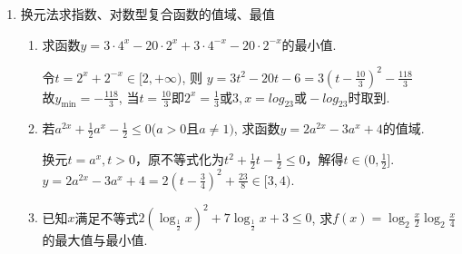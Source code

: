 \begin{enumerate}
\begin{enumerate}
\begin{jieda}
        \end{jieda}
        \item 关于$x$的方程$|3^x-1| = 2a$只有一个解，则$a$的取值范围是\blkda[3]{$[\frac{1}{2}, +\infty) \cup \{0\}$}.
        \begin{jieda}
            画图即可，$2a = 1$时是函数的渐近线，可以取得. 不要忘记$a = 0$时候也是只有一个解！
        \end{jieda}
    \item 已知函数$f(x) = \left \{ \begin{array}{ll}
        |log_2x| & 0 < x < 2 \\
        x^2 - 8x + 13 & x \geq 2
    \end{array} \right.$，若$f(x) = a$有四个解$x_1, x_2, x_3, x_4$，则$x_1 + x_2 + x_3 + x_4$的取值范围是.
    \begin{jieda}
        $x_1 \cdot x_2 = 1, x_3 + x_4 = 8$，$x_1 + x_2 + x_3 + x_4 = 8 + x_2 + \frac{1}{x_2}, x_2 \in (1, 2)$，故$x_1 + x_2 + x_3 + x_4 \in (10, \frac{21}{2})$ \\
        \ps \textbf{对数函数翻折时，总有和常函数交点横坐标乘积为定值}.
    \end{jieda}
    \end{enumerate}
        \item 换元法求指数、对数型复合函数的值域、最值
        \begin{enumerate}
        \item 求函数$y=3\cdot4^x-20\cdot2^x+3\cdot4^{-x}-20\cdot2^{-x}$的最小值. 
        \begin{jieda}
        令$t=2^x+2^{-x}\in[2,+\infty)$, 则
        $y = 3t^2-20t-6 = 3(t-\frac{10}{3})^2-\frac{118}{3}$ \\
        故$y_{\min}=-\frac{118}{3}$, 当$t=\frac{10}{3}$即$2^x = \frac{1}{3}\mbox{或}3, x=log_23 \mbox{或}-log_23$时取到. 
        \end{jieda}
        \item 若$a^{2x}+\frac{1}{2}a^x-\frac{1}{2}\leq 0$($a>0$且$a\neq 1)$, 求函数$y=2a^{2x}-3a^x+4$的值域. 
        \begin{jieda}
        换元$t = a^x, t > 0$，原不等式化为$t^2+\frac{1}{2}t-\frac{1}{2}\leq 0$，解得$t\in(0,\frac{1}{2}]$. \\
        $y=2a^{2x}-3a^x+4=2(t-\frac{3}{4})^2+\frac{23}{8}\in[3,4)$. 
        \end{jieda}
        \item 已知$x$满足不等式$2(\log_{\frac{1}{2}}x)^2+7\log_{\frac{1}{2}}x+3\leq 0$, 
        求$f(x)=\log_2\frac{x}{2}\log_2\frac{x}{4}$的最大值与最小值.

\end{enumerate}
\end{enumerate}
